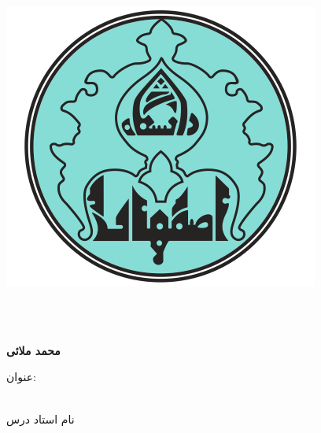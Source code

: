 \documentclass[]{article}
\begin{document}

\begin{center}

    \includegraphics[scale=0.2]{./UILogo.png}
    
    \University \\
    \Department\\
    
    
    \begin{large}
    \vspace{0.5cm}
    
    \end{large}
    
    \vspace{1cm}
    \begin{latin}
        {\Large\textbf\EnglishCourseTitle}
    \end{latin}
    \begin{center}
        \CourseName
    \end{center}

    \Large\textbf{محمد ملائی}
    
    \vspace{1cm}
    {عنوان:}\\[0.5em]
    {\LARGE\textbf{\CourseReportTitle}}\\ 
    
    \vspace{1.25cm}
    
    {\large\textbf{\courseSemester}}

    \vspace{1cm}
    {نام استاد درس}\\[0.5em]
    {\large\textbf{\CourseProfessor}}
    
    \vspace{1.2cm}

    \pagebreak
    
    \end{center}
\end{document}
